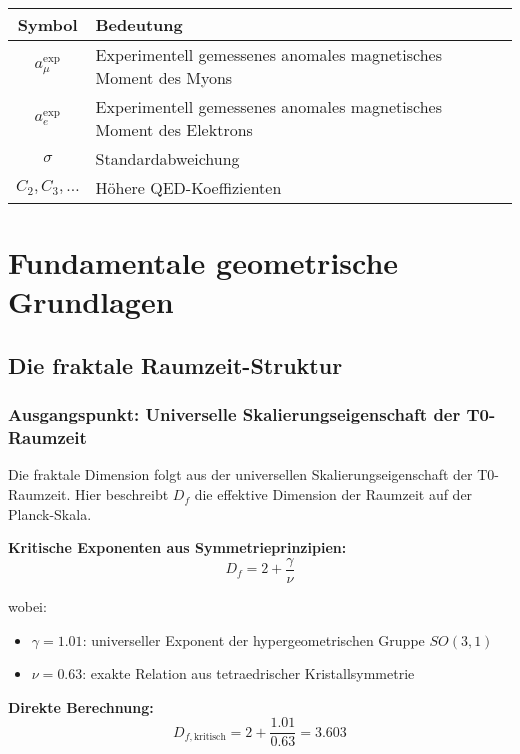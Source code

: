 \documentclass[12pt,a4paper]{article}
\numberwithin{equation}{section}
\newcommand{\Df}{D_f}
\newcommand{\Dfcritical}{D_{f,\text{kritisch}}}
\begin{document}
	\begin{longtable}{cl}
		\toprule
		\textbf{Symbol} & \textbf{Bedeutung} \\
		\midrule
		$a_\mu^{\exp}$ & Experimentell gemessenes anomales magnetisches Moment des Myons \\
		$a_e^{\exp}$ & Experimentell gemessenes anomales magnetisches Moment des Elektrons \\
		$\sigma$ & Standardabweichung \\
		$C_2, C_3, \ldots$ & Höhere QED-Koeffizienten \\
		\bottomrule
	\end{longtable}
	
	\section{Fundamentale geometrische Grundlagen}
	
	\subsection{Die fraktale Raumzeit-Struktur}
	
	\subsubsection{Ausgangspunkt: Universelle Skalierungseigenschaft der T0-Raumzeit}
	
	Die fraktale Dimension folgt aus der universellen Skalierungseigenschaft der T0-Raumzeit. Hier beschreibt $\Df$ die effektive Dimension der Raumzeit auf der Planck-Skala.
	
	\textbf{Kritische Exponenten aus Symmetrieprinzipien:}
	\begin{equation}
		\Df = 2 + \frac{\gamma}{\nu}
		\label{eq:fractal_dimension}
	\end{equation}
	
	wobei:
	\begin{itemize}
		\item $\gamma = 1.01$: universeller Exponent der hypergeometrischen Gruppe $SO(3,1)$
		\item $\nu = 0.63$: exakte Relation aus tetraedrischer Kristallsymmetrie
	\end{itemize}
	
	\textbf{Direkte Berechnung:}
	\begin{equation}
		\Dfcritical = 2 + \frac{1.01}{0.63} = 3.603
		\label{eq:df_critical}
	\end{equation}
	
\end{document}
